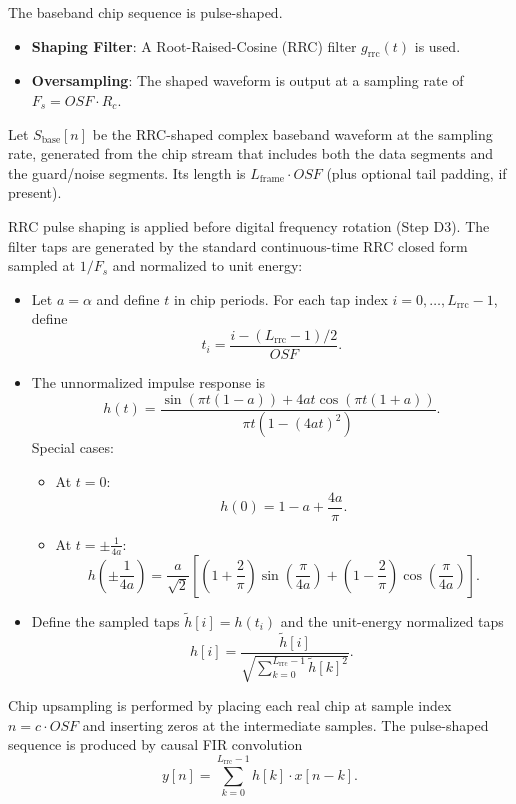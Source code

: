 \documentclass[11pt]{article}
\begin{document}
The baseband chip sequence is pulse-shaped.
\begin{itemize}
\item \textbf{Shaping Filter}: A Root-Raised-Cosine (RRC) filter $g_{\text{rrc}}(t)$ is used.
\item \textbf{Oversampling}: The shaped waveform is output at a sampling rate of $F_s = \mathit{OSF} \cdot R_c$.
\end{itemize}

Let $S_{\text{base}}[n]$ be the RRC-shaped complex baseband waveform at the sampling rate, generated from the chip stream that includes both the data segments and the guard/noise segments. Its length is $L_{\text{frame}}\cdot \mathit{OSF}$ (plus optional tail padding, if present).

RRC pulse shaping is applied before digital frequency rotation (Step D3). The filter taps are generated by the standard continuous-time RRC closed form sampled at $1/F_s$ and normalized to unit energy:

\begin{itemize}
\item Let $a=\alpha$ and define $t$ in chip periods. For each tap index $i=0,\dots,L_{\text{rrc}}-1$, define
  \[
    t_i = \frac{i - (L_{\text{rrc}}-1)/2}{\mathit{OSF}}.
  \]
\item The unnormalized impulse response is
  \[
    h(t)=\frac{\sin(\pi t(1-a)) + 4at\cos(\pi t(1+a))}{\pi t\left(1-(4at)^2\right)}.
  \]
  Special cases:
  \begin{itemize}
  \item At $t=0$:
    \[
      h(0) = 1-a+\frac{4a}{\pi}.
    \]
  \item At $t=\pm \frac{1}{4a}$:
    \[
      h\!\left(\pm\frac{1}{4a}\right)=\frac{a}{\sqrt{2}}\left[\left(1+\frac{2}{\pi}\right)\sin\!\left(\frac{\pi}{4a}\right)+\left(1-\frac{2}{\pi}\right)\cos\!\left(\frac{\pi}{4a}\right)\right].
    \]
  \end{itemize}
\item Define the sampled taps $\tilde h[i]=h(t_i)$ and the unit-energy normalized taps
  \[
    h[i]=\frac{\tilde h[i]}{\sqrt{\sum_{k=0}^{L_{\text{rrc}}-1} \tilde h[k]^2}}.
  \]
\end{itemize}

Chip upsampling is performed by placing each real chip at sample index $n = c\cdot \mathit{OSF}$ and inserting zeros at the intermediate samples. The pulse-shaped sequence is produced by causal FIR convolution
\[
  y[n]=\sum_{k=0}^{L_{\text{rrc}}-1} h[k]\cdot x[n-k].
\]
\end{document}

